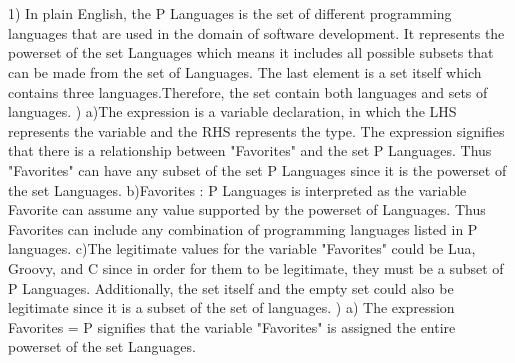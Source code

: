 \documentclass{article}
\begin{document}
\section{}
1)\newline\newline
In plain English, the P Languages is the set of different programming languages that are used in the domain of software development. It represents the powerset of the set Languages which means it includes all possible subsets that can be made from the set of Languages. The last element is a set itself which contains three languages.Therefore, the set contain both languages and sets of languages. 
\newline{})\newline\newline
a)\newline\newline The expression is a variable declaration, in which the LHS represents the variable and the RHS represents the type. The expression signifies that there is a relationship between "Favorites" and the set P Languages. Thus "Favorites" can have any subset of the set P Languages since it is the powerset of the set Languages. \newline\newline
b)\newline\newline Favorites : P Languages is interpreted as the variable Favorite can assume any value supported by the powerset of Languages. Thus Favorites can include any combination of programming languages listed in P languages. \newline\newline
c)\newline\newline The legitimate values for the variable "Favorites" could be Lua, Groovy, and C since in order for them to be legitimate, they must be a subset of P Languages. Additionally, the set itself and the empty set could also be legitimate since it is a subset of the set of languages.
\newline{})\newline\newline
a)\newline\newline
The expression Favorites = P signifies that the variable "Favorites" is assigned the entire powerset of the set Languages. \newline\newline
\end{document}

